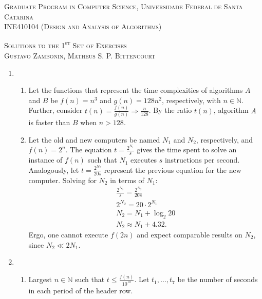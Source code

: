 \documentclass[12pt]{article}
\begin{document}
\textsc{Graduate Program in Computer Science,
  Universidade Federal de Santa Catarina} \\
\textsc{INE410104 (Design and Analysis of Algorithms)}

\textsc{Solutions to the 1\textsuperscript{st} Set of Exercises} \\
\textsc{Gustavo Zambonin, Matheus S. P. Bittencourt}

\begin{enumerate}
    \item 
    \begin{enumerate}
        \item Let the functions that represent the time complexities of algorithms $A$ and $B$ be $f(n) = n^{3}$ and $g(n) = 128n^{2}$, respectively, with $n \in \mathbb{N}$. Further, consider $t(n) = \frac{f(n)}{g(n)} \Rightarrow \frac{n}{128}$. By the ratio $t(n)$, algorithm $A$ is faster than $B$ when $n > 128$.
        \item Let the old and new computers be named $N_{1}$ and $N_{2}$, respectively, and $f(n) = 2^{n}$. The equation $t = \frac{2^{N_{1}}}{s}$ gives the time spent to solve an instance of $f(n)$ such that $N_{1}$ executes $s$ instructions per second. Analogously, let $t = \frac{2^{N_{2}}}{20s}$ represent the previous equation for the new computer. Solving for $N_{2}$ in terms of $N_{1}$:
        \begin{align*}
            \frac{2^{N_{1}}}{s} = \frac{2^{N_{2}}}{20s} \\
            2^{N_{2}} = 20 \cdot 2^{N_{1}} \\
            N_{2} = N_{1} + \log_{2} 20 \\
            N_{2} \approx N_{1} + 4.32.
        \end{align*}
        Ergo, one cannot execute $f(2n)$ and expect comparable results on $N_{2}$, since $N_{2} \ll 2 N_{1}$.
    \end{enumerate}
    \item
    \begin{enumerate}
        \item Largest $n \in \mathbb{N}$ such that $t \leq \frac{f(n)}{10^{10}}$. Let $t_{1}, \dots, t_{7}$ be
        the number of seconds in each period of the header row.
        \begin{table}[htbp]
            \renewcommand{\arraystretch}{1.2}
            \setlength{\tabcolsep}{7pt}
            \centering
            \begin{tabular}{l*{7}{r}}
                \toprule

\end{tabular}
\end{table}
\end{enumerate}
\end{enumerate}
\end{document}

